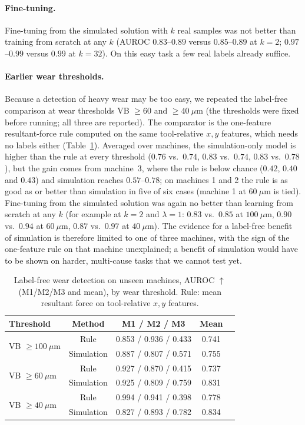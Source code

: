 \documentclass[11pt]{article}
\newcommand{\best}[1]{\cellcolor{gray!18}#1}
\begin{document}
\paragraph{Fine-tuning.} Fine-tuning from the simulated solution with $k$ real samples was not better than training from scratch at any $k$ (AUROC $0.83$--$0.89$ versus $0.85$--$0.89$ at $k{=}2$; $0.97$--$0.99$ versus $0.99$ at $k{=}32$). On this easy task a few real labels already suffice.
\paragraph{Earlier wear thresholds.} Because a detection of heavy wear may be too easy, we repeated the label-free comparison at wear thresholds VB $\ge60$ and $\ge40~\mu$m (the thresholds were fixed before running; all three are reported). The comparator is the one-feature resultant-force rule computed on the same tool-relative $x,y$ features, which needs no labels either (Table~\ref{tab:thr}). Averaged over machines, the simulation-only model is higher than the rule at every threshold ($0.76$ vs.\ $0.74$, $0.83$ vs.\ $0.74$, $0.83$ vs.\ $0.78$), but the gain comes from machine~3, where the rule is below chance ($0.42$, $0.40$ and $0.43$) and simulation reaches $0.57$--$0.78$; on machines 1 and 2 the rule is as good as or better than simulation in five of six cases (machine 1 at $60~\mu$m is tied). Fine-tuning from the simulated solution was again no better than learning from scratch at any $k$ (for example at $k{=}2$ and $\lambda{=}1$: $0.83$ vs.\ $0.85$ at $100~\mu$m, $0.90$ vs.\ $0.94$ at $60~\mu$m, $0.87$ vs.\ $0.97$ at $40~\mu$m). The evidence for a label-free benefit of simulation is therefore limited to one of three machines, with the sign of the one-feature rule on that machine unexplained; a benefit of simulation would have to be shown on harder, multi-cause tasks that we cannot test yet.
\begin{table}[t]\centering\small
\caption{Label-free wear detection on unseen machines, AUROC $\uparrow$ (M1/M2/M3 and mean), by wear threshold. Rule: mean resultant force on tool-relative $x,y$ features.}\label{tab:thr}
\begin{tabular}{lcccc}\toprule
Threshold & Method & M1 / M2 / M3 & Mean\\\midrule
\multirow{2}{*}{VB $\ge100~\mu$m} & Rule & 0.853 / 0.936 / 0.433 & 0.741\\
 & Simulation & 0.887 / 0.807 / 0.571 & \best{0.755}\\\midrule
\multirow{2}{*}{VB $\ge60~\mu$m} & Rule & 0.927 / 0.870 / 0.415 & 0.737\\
 & Simulation & 0.925 / 0.809 / 0.759 & \best{0.831}\\\midrule
\multirow{2}{*}{VB $\ge40~\mu$m} & Rule & 0.994 / 0.941 / 0.398 & 0.778\\
 & Simulation & 0.827 / 0.893 / 0.782 & \best{0.834}\\\bottomrule
\end{tabular}
\end{table}
\end{document}
